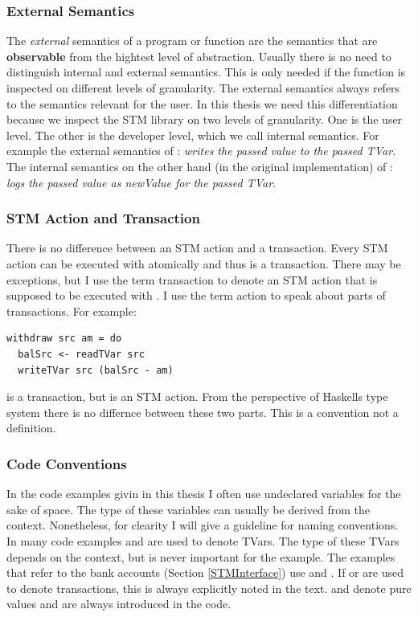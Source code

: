 \subsubsection{External Semantics}
The \textit{external} semantics of a program or function are the semantics that are \textbf{observable} from the 
hightest level of abstraction. Usually there
is no need to distinguish internal and external semantics. This is only needed if the function is inspected on 
different levels of granularity. The external semantics always refers to the semantics relevant for the user.
In this thesis we need this differentiation because we inspect the STM library on two levels of granularity. 
One is the user level. The other is the developer level, which we call 
internal semantics. For example the external semantics of :
\textit{writes the passed value to the passed TVar}.
The internal semantics on the other hand (in the original implementation) of :
\textit{logs the passed value as newValue for the passed TVar}.

\subsubsection{STM Action and Transaction}
There is no difference between an STM action and a transaction. Every STM action can be executed with 
atomically and thus is a transaction. There may be exceptions, but I use the term transaction to denote
an STM action that is supposed to be executed with . I use the term  action
to speak about parts of transactions. For example:
\begin{lstlisting}
withdraw src am = do
  balSrc <- readTVar src
  writeTVar src (balSrc - am)
\end{lstlisting}
 is a transaction, but  is an STM action. From the perspective
of Haskells type system there is no differnce between these two parts. This is a convention not a definition. 

\subsubsection{Code Conventions}
In the code examples givin in this thesis I often use undeclared variables for the sake of space.
The type of these variables can usually be derived from the context. Nonetheless, for 
clearity I will give a guideline for naming conventions. In many code examples  and  
are used to denote TVars. The type of these TVars depends on the context, but is never important for the
example. The examples that refer to the bank accounts (Section \ref{STMInterface}) use  and 
. If  or  are used to denote transactions, this is always explicitly 
noted in the text.  and  denote pure values and are always introduced in the code.

